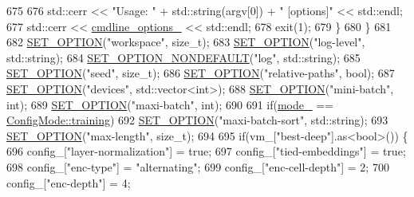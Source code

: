 \begin{DoxyCode}
675 
676       std::cerr << \textcolor{stringliteral}{"Usage: "} + std::string(argv[0]) + \textcolor{stringliteral}{" [options]"} << std::endl;
677       std::cerr << \hyperlink{classmarian_1_1ConfigParser_af57fa6f4fb82e1e5b6068e7dcb56b3b2}{cmdline\_options\_} << std::endl;
678       exit(1);
679     \}
680   \}
681 
682   \hyperlink{config__parser_8cpp_affc23be689aba6d401f64257177c293c}{SET\_OPTION}(\textcolor{stringliteral}{"workspace"}, \textcolor{keywordtype}{size\_t});
683   \hyperlink{config__parser_8cpp_affc23be689aba6d401f64257177c293c}{SET\_OPTION}(\textcolor{stringliteral}{"log-level"}, std::string);
684   \hyperlink{config__parser_8cpp_a662e89992591378e43abcff938a17669}{SET\_OPTION\_NONDEFAULT}(\textcolor{stringliteral}{"log"}, std::string);
685   \hyperlink{config__parser_8cpp_affc23be689aba6d401f64257177c293c}{SET\_OPTION}(\textcolor{stringliteral}{"seed"}, \textcolor{keywordtype}{size\_t});
686   \hyperlink{config__parser_8cpp_affc23be689aba6d401f64257177c293c}{SET\_OPTION}(\textcolor{stringliteral}{"relative-paths"}, \textcolor{keywordtype}{bool});
687   \hyperlink{config__parser_8cpp_affc23be689aba6d401f64257177c293c}{SET\_OPTION}(\textcolor{stringliteral}{"devices"}, std::vector<int>);
688   \hyperlink{config__parser_8cpp_affc23be689aba6d401f64257177c293c}{SET\_OPTION}(\textcolor{stringliteral}{"mini-batch"}, \textcolor{keywordtype}{int});
689   \hyperlink{config__parser_8cpp_affc23be689aba6d401f64257177c293c}{SET\_OPTION}(\textcolor{stringliteral}{"maxi-batch"}, \textcolor{keywordtype}{int});
690 
691   \textcolor{keywordflow}{if}(\hyperlink{classmarian_1_1ConfigParser_ae3bb2ffc2601222cc53734a60ab1f980}{mode\_} == \hyperlink{namespacemarian_aaddd4b008ff5352b1fe7e16574f7e1f9ac185ddac8b5a8f5aa23c5b80bc12d214}{ConfigMode::training})
692     \hyperlink{config__parser_8cpp_affc23be689aba6d401f64257177c293c}{SET\_OPTION}(\textcolor{stringliteral}{"maxi-batch-sort"}, std::string);
693   \hyperlink{config__parser_8cpp_affc23be689aba6d401f64257177c293c}{SET\_OPTION}(\textcolor{stringliteral}{"max-length"}, \textcolor{keywordtype}{size\_t});
694 
695   \textcolor{keywordflow}{if}(vm\_[\textcolor{stringliteral}{"best-deep"}].as<bool>()) \{
696     config\_[\textcolor{stringliteral}{"layer-normalization"}] = \textcolor{keyword}{true};
697     config\_[\textcolor{stringliteral}{"tied-embeddings"}] = \textcolor{keyword}{true};
698     config\_[\textcolor{stringliteral}{"enc-type"}] = \textcolor{stringliteral}{"alternating"};
699     config\_[\textcolor{stringliteral}{"enc-cell-depth"}] = 2;
700     config\_[\textcolor{stringliteral}{"enc-depth"}] = 4;

\end{DoxyCode}
